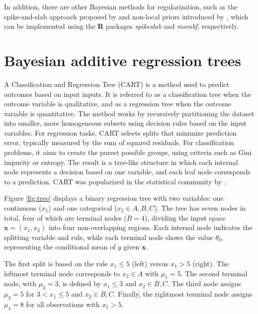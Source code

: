 In addition, there are other Bayesian methods for regularization, such as the spike-and-slab approach proposed by \cite{Ishwaran2005} and non-local priors introduced by \cite{johnson2012bayesian}, which can be implemented using the \textbf{R} packages \textit{spikeslab} and \textit{mombf}, respectively.



\section{Bayesian additive regression trees}\label{sec13_3}

A Classification and Regression Tree (CART) is a method used to predict outcomes based on input inputs. It is referred to as a classification tree when the outcome variable is qualitative, and as a regression tree when the outcome variable is quantitative. The method works by recursively partitioning the dataset into smaller, more homogeneous subsets using decision rules based on the input variables. For regression tasks, CART selects splits that minimize prediction error, typically measured by the sum of squared residuals. For classification problems, it aims to create the purest possible groups, using criteria such as Gini impurity or entropy. The result is a tree-like structure in which each internal node represents a decision based on one variable, and each leaf node corresponds to a prediction. CART was popularized in the statistical community by \cite{breiman1984classification}.

Figure \ref{fig:tree} displays a binary regression tree with two variables: one continuous ($x_1$) and one categorical ($x_2 \in {A, B, C}$). The tree has seven nodes in total, four of which are terminal nodes ($B = 4$), dividing the input space $\mathbf{x} = (x_1, x_2)$ into four non-overlapping regions. Each internal node indicates the splitting variable and rule, while each terminal node shows the value $\theta_b$, representing the conditional mean of $y$ given $\mathbf{x}$.

The first split is based on the rule $x_1 \leq 5$ (left) versus $x_1 > 5$ (right). The leftmost terminal node corresponds to $x_2 \in {A}$ with $\mu_1 = 5$. The second terminal node, with $\mu_2 = 3$, is defined by $x_1 \leq 3$ and $x_2 \in {B, C}$. The third node assigns $\mu_3 = 5$ for $3 < x_1 \leq 5$ and $x_2 \in {B, C}$. Finally, the rightmost terminal node assigns $\mu_4 = 8$ for all observations with $x_1 > 5$.

